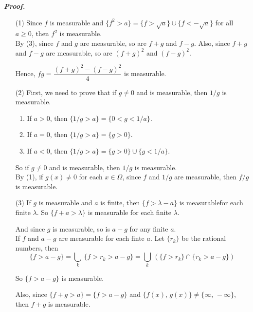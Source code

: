 \documentclass[a4paper,11pt]{article}
\begin{document}
\textbf{\textit{Proof.}}
\begin{enumerate}
	\item[(1)] Since $f$ is measurable and $\{f^2 > a\} = \{f > \sqrt{a}\} \cup \{f < -\sqrt{a}\}$ for all $a \geq 0$, then $f^2$ is measurable.\\

	By (3), since $f$ and $g$ are measurable, so are $f + g$ and $f - g$. Also, since $f + g$ and $f - g$ are measurable, so are $(f + g)^2$ and $(f - g)^2$.

	Hence, $fg = \dfrac{(f + g)^2 - (f - g)^2}{4}$ is measurable.\\

	\item[(2)] First, we need to prove that if $g \neq 0$ and is measurable, then $1/g$ is measurable.
		\begin{enumerate}
			\item If $a > 0$, then $\{1/g > a\} = \{0 < g < 1/a\}$.

			\item If $a = 0$, then $\{1/g > a\} = \{g > 0\}$.

			\item If $a < 0$, then $\{1/g > a\} = \{g > 0\} \cup \{g < 1/a\}$.
		\end{enumerate}

	So if $g \neq 0$ and is measurable, then $1/g$ is measurable.\\

	By (1), if $g(x) \neq 0$ for each $x \in \Omega$, since $f$ and $1/g$ are measurable, then $f/g$ is measurable.\\

	\item[(3)] If $g$ is measurable and $a$ is finite, then $\{f > \lambda - a\}$ is measurablefor each finite $\lambda$. So $\{f + a > \lambda\}$ is measurable for each finite $\lambda$.

	And since $g$ is measurable, so is $a - g$ for any finite $a$.\\

	If $f$ and $a - g$ are measurable for each finte $a$. Let $\{r_k\}$ be the rational numbers, then
		$$\{f > a - g\}
		= \bigcup_k\,\{f > r_k > a - g\}
		= \bigcup_k\,(\{f > r_k\} \cap \{r_k > a - g\})$$

	So $\{f > a - g\}$ is measurable.

	Also, since $\{f + g > a\} = \{f > a - g\}$ and $\{f(x),\,g(x)\} \neq \{\infty,\,-\infty\}$, then $f + g$ is measurable.\\\\


\end{enumerate}
\end{document}
